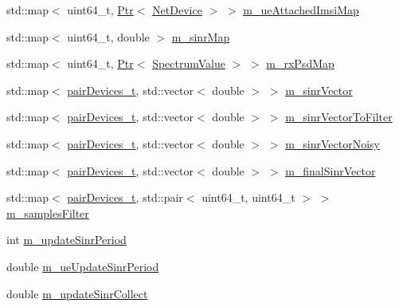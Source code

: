 \begin{DoxyCompactItemize}
\item 
std\+::map$<$ uint64\+\_\+t, \hyperlink{classns3_1_1Ptr}{Ptr}$<$ \hyperlink{classns3_1_1NetDevice}{Net\+Device} $>$ $>$ \hyperlink{classns3_1_1MmWaveEnbPhy_a1e8b3730ff37d9fc19d9ec07f06e6be5}{m\+\_\+ue\+Attached\+Imsi\+Map}
\item 
std\+::map$<$ uint64\+\_\+t, double $>$ \hyperlink{classns3_1_1MmWaveEnbPhy_a754de7cf4bdbe107dfb006a5b332842a}{m\+\_\+sinr\+Map}
\item 
std\+::map$<$ uint64\+\_\+t, \hyperlink{classns3_1_1Ptr}{Ptr}$<$ \hyperlink{classns3_1_1SpectrumValue}{Spectrum\+Value} $>$ $>$ \hyperlink{classns3_1_1MmWaveEnbPhy_a40b3813d00f430aed47e1ee084df4d78}{m\+\_\+rx\+Psd\+Map}
\item 
std\+::map$<$ \hyperlink{namespacens3_abe460b1ad735ce7c8e408857371b87af}{pair\+Devices\+\_\+t}, std\+::vector$<$ double $>$ $>$ \hyperlink{classns3_1_1MmWaveEnbPhy_a9e1e37ef62d54fbfc28bfd829e78f239}{m\+\_\+sinr\+Vector}
\item 
std\+::map$<$ \hyperlink{namespacens3_abe460b1ad735ce7c8e408857371b87af}{pair\+Devices\+\_\+t}, std\+::vector$<$ double $>$ $>$ \hyperlink{classns3_1_1MmWaveEnbPhy_a2887e6ce935c6d25fc2759269b811bbe}{m\+\_\+sinr\+Vector\+To\+Filter}
\item 
std\+::map$<$ \hyperlink{namespacens3_abe460b1ad735ce7c8e408857371b87af}{pair\+Devices\+\_\+t}, std\+::vector$<$ double $>$ $>$ \hyperlink{classns3_1_1MmWaveEnbPhy_a796cebfd5468736861afc539d2ec4098}{m\+\_\+sinr\+Vector\+Noisy}
\item 
std\+::map$<$ \hyperlink{namespacens3_abe460b1ad735ce7c8e408857371b87af}{pair\+Devices\+\_\+t}, std\+::vector$<$ double $>$ $>$ \hyperlink{classns3_1_1MmWaveEnbPhy_a6c34c832c1bcb05fab00a4435cc499d0}{m\+\_\+final\+Sinr\+Vector}
\item 
std\+::map$<$ \hyperlink{namespacens3_abe460b1ad735ce7c8e408857371b87af}{pair\+Devices\+\_\+t}, std\+::pair$<$ uint64\+\_\+t, uint64\+\_\+t $>$ $>$ \hyperlink{classns3_1_1MmWaveEnbPhy_afee86fc55fdcef25ada2042be5740c62}{m\+\_\+samples\+Filter}
\item 
int \hyperlink{classns3_1_1MmWaveEnbPhy_af5b7224db4adb4c546e71ec42ce82703}{m\+\_\+update\+Sinr\+Period}
\item 
double \hyperlink{classns3_1_1MmWaveEnbPhy_aba71f2faaa7e68f79e9156d37c6fed57}{m\+\_\+ue\+Update\+Sinr\+Period}
\item 
double \hyperlink{classns3_1_1MmWaveEnbPhy_a3503822fc1d570af3806d0fa70d1a9f0}{m\+\_\+update\+Sinr\+Collect}
\item 

\end{DoxyCompactItemize}
